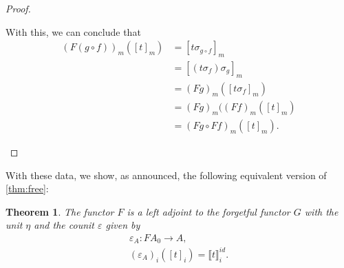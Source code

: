 \documentclass[11pt,a4paper]{amsart}
\newtheorem{theorem}{Theorem}[section]
\theoremstyle{plain}
\newcommand{\id}{\mathit{id}}
\numberwithin{equation}{section}
\newcommand{\+}[1]{\mathcal{#1}\xspace}
\theoremstyle{definition}
\begin{document}
\begin{proof}
\begin{enumerate}[wide]
            With this, we can conclude that
            \begin{align*}
                (F(g \circ f))_m([t]_m)
                &= [t\sigma_{g \circ f}]_m \\
                &= [(t\sigma_f)\sigma_g]_m \\
                &= (Fg)_m([t\sigma_f]_m) \\
                &= (Fg)_m((Ff)_m([t]_m) \\
                &= (Fg \circ Ff)_m([t]_m).
            \end{align*}
    \end{enumerate}
\end{proof}
\noindent With these data, we show, as announced, the following equivalent version of \cref{thm:free}:
\begin{theorem}\label{thm:adjunction}
    The functor \(F\) is a left adjoint to the forgetful functor \(G\) with the unit \(\eta\) and the counit \(\varepsilon\) given by
    \begin{gather*}
        \varepsilon_A\colon FA_0 \to A, \\
        (\varepsilon_A)_i([t]_i) = \llbracket t \rrbracket^{\id}_i.
    \end{gather*}
\end{theorem}
\end{document}
